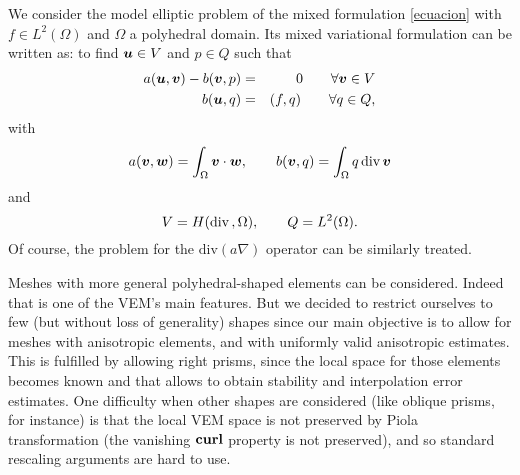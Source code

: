 We consider the model elliptic problem of the mixed
formulation \eqref{ecuacion}  with 
$f\in L^2(\Omega)$ and $\Omega$ a polyhedral domain. Its mixed 
variational formulation can be written as: to find $\boldsymbol{u}\in V$ and $p\in Q$ 
such that
\begin{eqnarray}\label{P}
a(\boldsymbol{u},\boldsymbol{v}) - b(\boldsymbol{v},p) & = & 0 \qquad \forall \boldsymbol{v}\in V\\ \nonumber b(\boldsymbol{u},q) &
= & (f,q)\qquad \forall q\in Q,  
\end{eqnarray}
with
\[
a(\boldsymbol{v},\boldsymbol{w})=\int_\Omega\boldsymbol{v}\cdot\boldsymbol{w},\qquad b(\boldsymbol{v},q)=\int_\Omega
q\,\mbox{div\,}\boldsymbol{v}
\]
and
\[
V=H(\mbox{div\,},\Omega), \qquad Q=L^2(\Omega).
\]
Of course, the problem for the $\mbox{div}(a\nabla)$ operator can be similarly treated. 


Meshes with more general polyhedral-shaped elements can be considered. 
Indeed that is one of the VEM's main features. But we decided to restrict ourselves to few (but without loss of generality) 
shapes since our main objective is to allow for meshes with anisotropic elements, and with uniformly valid anisotropic 
estimates. This is fulfilled by allowing right prisms, since the local space for those elements becomes known \cite{nedelec2} 
and that allows to obtain stability and interpolation error estimates. One difficulty when other shapes are considered (like 
oblique prisms, for instance) is that the local VEM space is not preserved by Piola transformation (the vanishing ${\bf curl}$ 
property is not preserved), and so standard rescaling arguments are hard to use.  



